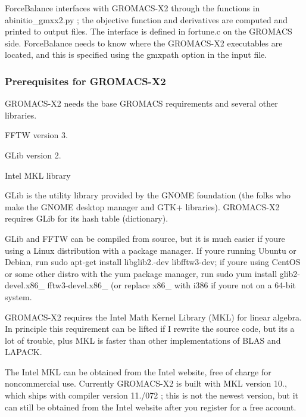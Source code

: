 Force\+Balance interfaces with G\+R\+O\+M\+A\+C\+S-\/\+X2 through the functions in {\ttfamily abinitio\+\_\+gmxx2.\+py} ; the objective function and derivatives are computed and printed to output files. The interface is defined in {\ttfamily fortune.\+c} on the G\+R\+O\+M\+A\+CS side. Force\+Balance needs to know where the G\+R\+O\+M\+A\+C\+S-\/\+X2 executables are located, and this is specified using the {\ttfamily gmxpath} option in the input file.\hypertarget{installation_install_gmxx2_prerequisites}{}\subsubsection{Prerequisites for G\+R\+O\+M\+A\+C\+S-\/\+X2}\label{installation_install_gmxx2_prerequisites}
G\+R\+O\+M\+A\+C\+S-\/\+X2 needs the base G\+R\+O\+M\+A\+CS requirements and several other libraries.

\begin{DoxyItemize}
\item F\+F\+TW version 3. \item G\+Lib version 2. \item Intel M\+KL library\end{DoxyItemize}
G\+Lib is the utility library provided by the G\+N\+O\+ME foundation (the folks who make the G\+N\+O\+ME desktop manager and G\+T\+K+ libraries). G\+R\+O\+M\+A\+C\+S-\/\+X2 requires G\+Lib for its hash table (dictionary).

G\+Lib and F\+F\+TW can be compiled from source, but it is much easier if you\textquotesingle{}re using a Linux distribution with a package manager. If you\textquotesingle{}re running Ubuntu or Debian, run {\ttfamily sudo apt-\/get install libglib2.-\/dev libfftw3-\/dev}; if you\textquotesingle{}re using Cent\+OS or some other distro with the yum package manager, run {\ttfamily sudo yum install glib2-\/devel.\+x86\+\_ fftw3-\/devel.\+x86\+\_} (or replace {\ttfamily x86\+\_} with {\ttfamily i386} if you\textquotesingle{}re not on a 64-\/bit system.

G\+R\+O\+M\+A\+C\+S-\/\+X2 requires the Intel Math Kernel Library (M\+KL) for linear algebra. In principle this requirement can be lifted if I rewrite the source code, but it\textquotesingle{}s a lot of trouble, plus M\+KL is faster than other implementations of B\+L\+AS and L\+A\+P\+A\+CK.

The Intel M\+KL can be obtained from the Intel website, free of charge for noncommercial use. Currently G\+R\+O\+M\+A\+C\+S-\/\+X2 is built with M\+KL version 10., which ships with compiler version 11./072 ; this is not the newest version, but it can still be obtained from the Intel website after you register for a free account.

